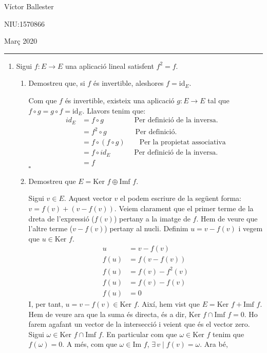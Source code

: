 \documentclass[11pt,a4paper]{article}
\newcommand*{\QED}{\hfill\ensuremath{\square}}
\begin{document}
\begin{flushright}
    Víctor Ballester\par NIU:1570866\par Març 2020
\end{flushright}
\rule{180mm}{0.1mm}\par
\begin{enumerate}
    \item Sigui $f:E\longrightarrow E$ una aplicació lineal satisfent $f^2=f$.
    \begin{enumerate}
        \item Demostreu que, si $f$ és invertible, aleshores $f=\text{id}_E$.\par
        Com que $f$ és invertible, existeix una aplicació $g:E\longrightarrow E$ tal que $f\circ g=g\circ f=\text{id}_E$. Llavors tenim que: 
        \begin{align*}
            id_E&=f\circ g \qquad\qquad\;\text{Per definició de la inversa.}\\
            &=f^2\circ g \qquad\qquad\!\text{Per definició.}\\
            &=f\circ(f\circ g) \qquad\text{Per la propietat associativa}\\
            &=f\circ id_E \qquad\quad\;\text{Per definició de la inversa.}\\
            &=f
        \end{align*}\QED
        \item Demostreu que $E=\text{Ker }f\oplus\text{Imf }f$.\par
        Sigui $v\in E$. Aquest vector $v$ el podem escriure de la següent forma: $v=f(v)+(v-f(v))$. Veiem clarament que el primer terme de la dreta de l'expressió ($f(v)$) pertany a la imatge de $f$. Hem de veure que l'altre terme ($v-f(v)$) pertany al nucli. Definim $u=v-f(v)$ i vegem que $u\in \text{Ker }f$.
        \begin{align*}
            u&=v-f(v)\\
            f(u)&=f(v-f(v))\\
            f(u)&=f(v)-f^2(v)\\
            f(u)&=f(v)-f(v)\\
            f(u)&=0
        \end{align*}
        I, per tant, $u=v-f(v)\in \text{Ker }f$. Així, hem vist que $E=\text{Ker }f+\text{Imf }f$. Hem de veure ara que la suma és directa, és a dir, $\text{Ker }f\cap\text{Imf }f={0}$. Ho farem agafant un vector de la intersecció i veient que és el vector zero. Sigui $\omega\in\text{Ker }f\cap\text{Imf }f$. En particular com que $\omega\in\text{Ker }f$ tenim que $f(\omega)=0$. A més, com que $\omega\in\text{Im }f$, $\exists\,v \mid f(v)=\omega$. Ara bé,

\end{enumerate}
\end{enumerate}
\end{document}
